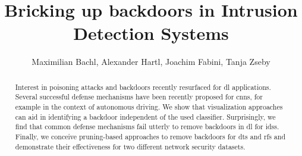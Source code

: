 \documentclass[10pt,sigconf,letterpaper,dvipsnames]{acmart}
\begin{document}
\title{Bricking up backdoors in Intrusion Detection Systems}



\begin{abstract}
Interest in poisoning attacks and backdoors recently resurfaced for \gls{dl} applications. Several successful defense mechanisms have been recently proposed for \glspl{cnn}, for example in the context of autonomous driving. We show that visualization approaches can aid in identifying a backdoor independent of the used classifier. Surprisingly, we find that common defense mechanisms fail utterly to remove backdoors in \gls{dl} for \glspl{ids}. Finally, we conceive pruning-based approaches to remove backdoors for \glspl{dt} and \glspl{rf} and demonstrate their effectiveness for two different %
network security datasets.
\end{abstract}

\author{Maximilian Bachl, Alexander Hartl, Joachim Fabini, Tanja Zseby}


\end{document}
